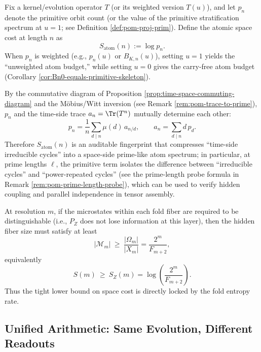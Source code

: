 \begin{definition}\label{def:pom-atom-space-cost}
Fix a kernel/evolution operator $T$ (or its weighted version $T(u)$), and let $p_n$ denote the primitive orbit count (or the value of the primitive stratification spectrum at $u=1$; see Definition \ref{def:pom-proj-prim}). Define the atomic space cost at length $n$ as
$$
S_{\mathrm{atom}}(n):=\log p_n.
$$
When $p_n$ is weighted (e.g., $p_n(u)$ or $B_{K,n}(u)$), setting $u=1$ yields the ``unweighted atom budget,'' while setting $u=0$ gives the carry-free atom budget (Corollary \ref{cor:Bn0-equals-primitive-skeleton}).
\end{definition}

\begin{remark}\label{rem:pom-atom-audit}
By the commutative diagram of Proposition \ref{prop:time-space-commuting-diagram} and the M\"obius/Witt inversion (see Remark \ref{rem:pom-trace-to-prime}), $p_n$ and the time-side trace $a_n=\Tr(T^n)$ mutually determine each other:
$$
p_n=\frac{1}{n}\sum_{d\mid n}\mu(d)\,a_{n/d},
\qquad
a_n=\sum_{d\mid n} d\,p_d.
$$
Therefore $S_{\mathrm{atom}}(n)$ is an auditable fingerprint that compresses ``time-side irreducible cycles'' into a space-side prime-like atom spectrum; in particular, at prime lengths $\ell$, the primitive term isolates the difference between ``irreducible cycles'' and ``power-repeated cycles'' (see the prime-length probe formula in Remark \ref{rem:pom-prime-length-probe}), which can be used to verify hidden coupling and parallel independence in tensor assembly.
\end{remark}

\begin{corollary}\label{cor:pom-space-lower-bound}
At resolution $m$, if the microstates within each fold fiber are required to be distinguishable (i.e., $P_Z$ does not lose information at this layer), then the hidden fiber size must satisfy at least
\[
|\mathcal M_m|\ \ge\ \frac{|\Omega_m|}{|X_m|}=\frac{2^m}{F_{m+2}},
\]
equivalently
\[
S(m)\ \ge\ S_Z(m)=\log\!\left(\frac{2^m}{F_{m+2}}\right).
\]
Thus the tight lower bound on space cost is directly locked by the fold entropy rate.
\end{corollary}

\subsection{Unified Arithmetic: Same Evolution, Different Readouts}\label{subsec:pom-unified-arith}

